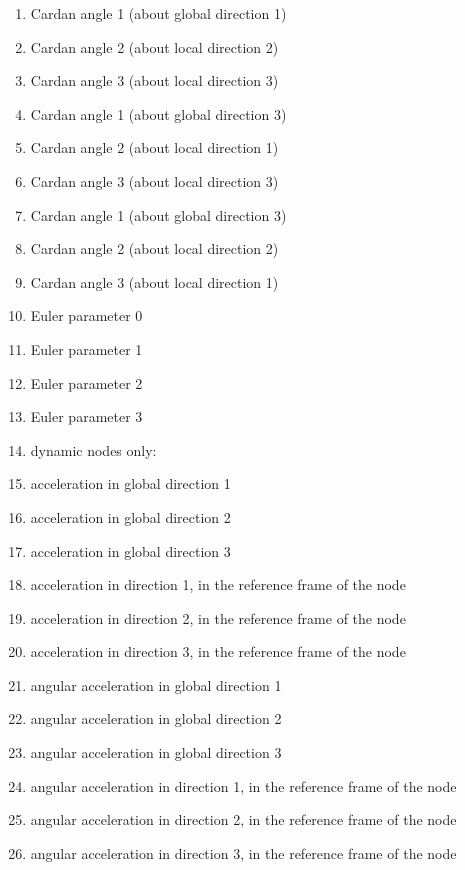 \begin{enumerate}
\item {} Cardan angle 1 (about global direction 1)
\item {} Cardan angle 2 (about local direction 2)
\item {} Cardan angle 3 (about local direction 3)
\item {} Cardan angle 1 (about global direction 3)
\item {} Cardan angle 2 (about local direction 1)
\item {} Cardan angle 3 (about local direction 3)
\item {} Cardan angle 1 (about global direction 3)
\item {} Cardan angle 2 (about local direction 2)
\item {} Cardan angle 3 (about local direction 1)
\item {} Euler parameter 0
\item {} Euler parameter 1
\item {} Euler parameter 2
\item {} Euler parameter 3
\item[] dynamic nodes only:
\item {} acceleration in global direction 1
\item {} acceleration in global direction 2
\item {} acceleration in global direction 3
\item {} acceleration in direction 1, in the reference frame of the node
\item {} acceleration in direction 2, in the reference frame of the node
\item {} acceleration in direction 3, in the reference frame of the node
\item {} angular acceleration in global direction 1
\item {} angular acceleration in global direction 2
\item {} angular acceleration in global direction 3
\item {} angular acceleration in direction 1, in the reference frame of the node
\item {} angular acceleration in direction 2, in the reference frame of the node
\item {} angular acceleration in direction 3, in the reference frame of the node
\end{enumerate}

